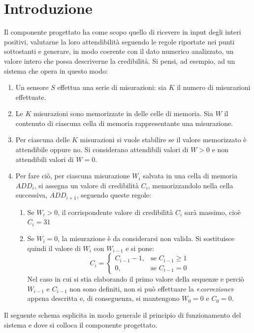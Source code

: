 \documentclass[10pt]{article}
\begin{document}
	\section{Introduzione}
	Il componente progettato ha come scopo quello di ricevere in input degli interi positivi, valutarne la loro attendibilità seguendo le regole riportate nei punti sottostanti e generare, in modo coerente con il dato numerico analizzato, un valore intero che possa descriverne la credibilità. Si pensi, ad esempio, ad un sistema che opera in questo modo:
	\begin{enumerate}
		\item Un sensore $S$ effettua una serie di misurazioni: sia $K$ il numero di misurazioni effettuate.
		\item Le $K$ misurazioni sono memorizzate in delle celle di memoria. Sia $W$  il contenuto di ciascuna cella di memoria rappresentante una misurazione.
		\item Per ciascuna delle $K$ misurazioni si vuole stabilire se il valore memorizzato è attendibile oppure no. Si considerano attendibili valori di $W>0$ e non attendibili valori di $W=0$.
		\item Per fare ciò, per ciascuna misurazione $W_i$ salvata in una cella di memoria $ADD_i$, si assegna un valore di credibilità $C_i$, memorizzandolo nella cella successiva, $ADD_{i+1}$, seguendo queste regole:
		\begin{enumerate}
			\item Se $W_i > 0$, il corrispondente valore di credibilità $C_i$ sarà massimo, cioè $C_i = 31$
			\item Se $W_i = 0$, la misurazione è da considerarsi non valida. Si sostituisce quindi il valore di $W_i$ con $W_{i-1}$ e si pone:
			\begin{equation*}
				C_i =
				\begin{cases} 
					C_{i-1} - 1, & \mbox{se } C_{i-1} \geq 1 \\ 
					0, & \mbox{se } C_{i-1} = 0
				\end{cases}
			\end{equation*}
			Nel caso in cui si stia elaborando il primo valore della sequenze e perciò $W_{i-1}$ e $C_{i-1}$ non sono definiti, non si può effettuare la «\textit{correzione}» appena descritta e, di conseguenza, si mantengono $W_0= 0$ e  $C_0 = 0$.
		\end{enumerate}
	\end{enumerate}
	Il seguente schema esplicita in modo generale il principio di funzionamento del sistema e dove si colloca il componente progettato.
\end{document}
